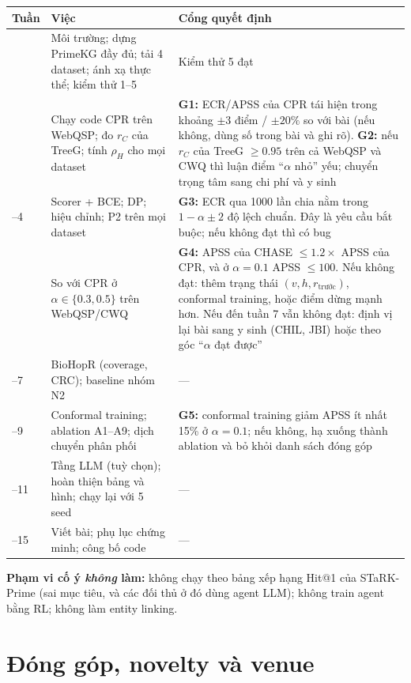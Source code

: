 \documentclass[11pt,a4paper]{article}
\theoremstyle{remark}
\newcommand{\method}{\textsc{CHASE}}
\begin{document}
\begin{center}
\small
\begin{tabularx}{\linewidth}{>{\raggedright\arraybackslash}p{1.5cm} >{\raggedright\arraybackslash}X >{\raggedright\arraybackslash}p{5.2cm}}
\toprule
Tuần & Việc & Cổng quyết định \\
\midrule
1 & Môi trường; dựng PrimeKG đầy đủ; tải 4 dataset; ánh xạ thực thể; kiểm thử 1--5 & Kiểm thử 5 đạt \\
2 & Chạy code CPR trên WebQSP; đo $r_C$ của TreeG; tính $\rho_H$ cho mọi dataset & \textbf{G1:} ECR/APSS của CPR tái hiện trong khoảng $\pm3$ điểm / $\pm20\%$ so với bài (nếu không, dùng số trong bài và ghi rõ). \textbf{G2:} nếu $r_C$ của TreeG $\ge0.95$ trên cả WebQSP và CWQ thì luận điểm ``$\alpha$ nhỏ'' yếu; chuyển trọng tâm sang chi phí và y sinh \\
3--4 & Scorer + BCE; DP; hiệu chỉnh; P2 trên mọi dataset & \textbf{G3:} ECR qua 1000 lần chia nằm trong $1-\alpha\pm2$ độ lệch chuẩn. Đây là yêu cầu bắt buộc; nếu không đạt thì có bug \\
5 & So với CPR ở $\alpha\in\{0.3,0.5\}$ trên WebQSP/CWQ & \textbf{G4:} APSS của \method{} $\le1.2\times$ APSS của CPR, và ở $\alpha=0.1$ APSS $\le100$. Nếu không đạt: thêm trạng thái $(v,h,r_{\text{trước}})$, conformal training, hoặc điểm dừng mạnh hơn. Nếu đến tuần 7 vẫn không đạt: định vị lại bài sang y sinh (CHIL, JBI) hoặc theo góc ``$\alpha$ đạt được'' \\
6--7 & BioHopR (coverage, CRC); baseline nhóm N2 & --- \\
8--9 & Conformal training; ablation A1--A9; dịch chuyển phân phối & \textbf{G5:} conformal training giảm APSS ít nhất 15\% ở $\alpha=0.1$; nếu không, hạ xuống thành ablation và bỏ khỏi danh sách đóng góp \\
10--11 & Tầng LLM (tuỳ chọn); hoàn thiện bảng và hình; chạy lại với 5 seed & --- \\
12--15 & Viết bài; phụ lục chứng minh; công bố code & --- \\
\bottomrule
\end{tabularx}
\end{center}

\noindent\textbf{Phạm vi cố ý \emph{không} làm:} không chạy theo bảng xếp hạng Hit@1 của STaRK-Prime (sai mục tiêu, và các đối thủ ở đó dùng agent LLM); không train agent bằng RL; không làm entity linking.

\section{Đóng góp, novelty và venue}
\end{document}
